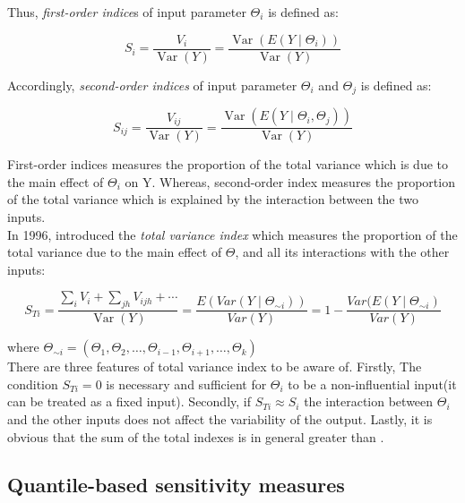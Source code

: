 \noindent
Thus, \textit{first-order indice}s of input parameter $\Theta_i$ is defined as:

\begin{equation} \label{eq:8}
S_i = \frac{V_i}{\operatorname{Var}(Y)}=\frac{\operatorname{Var}(E(Y \mid \Theta_i))}{\operatorname{Var}(Y)}
\end{equation}

\noindent
Accordingly, \textit{second-order indices} of input parameter $\Theta_i$ and $\Theta_j$ is defined as:


\begin{equation} \label{eq:9}
S_{ij} = \frac{V_{ij}}{\operatorname{Var}(Y)}=\frac{\operatorname{Var}(E(Y \mid \Theta_i,\Theta_j))}{\operatorname{Var}(Y)}
\end{equation}

\noindent
First-order indices measures the proportion of the total variance which is due to the main effect of $\Theta_i$ on Y. Whereas, second-order index measures the proportion of the total variance which is explained by the interaction between the two inputs. \\

\noindent
In 1996, \cite{homma1996ImportanceMeasuresGlobal} introduced the \textit{total variance index} which measures the proportion of the total variance due to the
main effect of $\Theta$, and all its interactions with the other inputs:

\begin{equation} \label{eq:10}
S_{Ti}=\frac{\sum_{i} V_{i}+\sum_{j h} V_{i j h}+\cdots}{\operatorname{Var}(Y)} = \frac{E(Var(Y \mid \Theta_{\sim i}))}{Var(Y)}=1-\frac{Var(E(Y \mid \Theta _{\sim i})}{Var(Y)}
\end{equation}

\noindent
where $\Theta_{\sim i}=(\Theta_1, \Theta_2, \dots, \Theta_{i-1}, \Theta_{i+1}, \dots ,  \Theta_k)$ \\

\noindent
There are three features of total variance index to be aware of. Firstly, The condition $S_{Ti}=0$ is necessary and sufficient for $\Theta_i$ to be a non-influential input(it can be treated as a fixed input). Secondly, if $S_{Ti} \approx S_i$ the interaction between $\Theta_i$ and the other inputs does not affect the variability of the output. Lastly, it is obvious that the sum of the total indexes is in general greater than \cite{homma1996ImportanceMeasuresGlobal}.


\subsection{Quantile-based sensitivity measures}  \label{sec:3.3}

